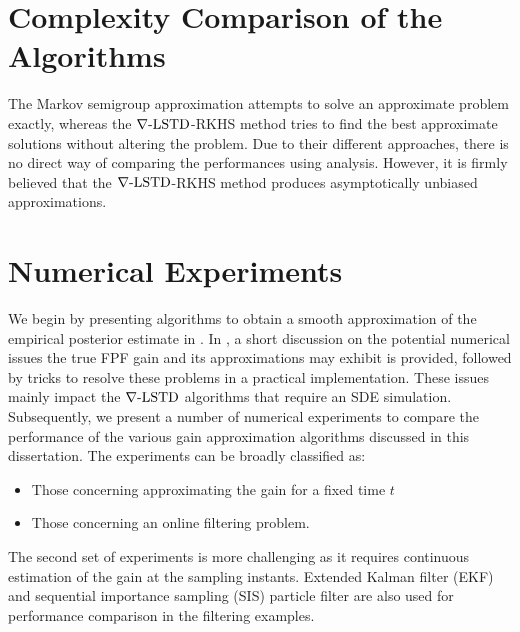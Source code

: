 \section{Complexity Comparison of the Algorithms}
\label{s:computational_complexity}
The Markov semigroup approximation attempts to solve an approximate problem exactly, whereas the $\nabla\text{-LSTD}$-RKHS method tries to find the best approximate solutions without altering the problem. Due to their different approaches, there is no direct way of comparing the performances using analysis. However, it is firmly believed that the $\nabla\text{-LSTD}$-RKHS method produces asymptotically unbiased approximations.

\section{Numerical Experiments}
\label{s:fpf_numerics}
We begin by presenting algorithms to obtain a smooth approximation of the empirical posterior estimate in . In , a short discussion on the potential numerical issues the true FPF gain and its approximations may exhibit is provided, followed by tricks to resolve these problems in a practical implementation. These issues mainly impact the $\nabla\text{-LSTD}$ algorithms that require an SDE simulation. Subsequently, we present a number of numerical experiments to compare the performance of the various gain approximation algorithms discussed in this dissertation. The experiments can be broadly classified as:
\begin{itemize}
 \item Those concerning approximating the gain for a fixed time $t$ 
 \item Those concerning an online filtering problem. 
\end{itemize}
The second set of experiments is more challenging as it requires continuous estimation of the gain at the sampling instants. Extended Kalman filter (EKF) and sequential importance sampling (SIS) particle filter are also used for performance comparison in the filtering examples.  
